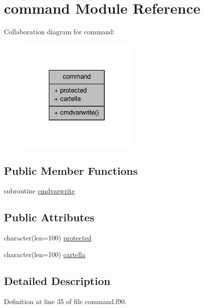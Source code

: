 \hypertarget{classcommand}{\section{command Module Reference}
\label{classcommand}
}


Collaboration diagram for command\-:\nopagebreak
\begin{figure}[H]
\begin{center}
\leavevmode
\includegraphics[width=164pt]{classcommand__coll__graph}
\end{center}
\end{figure}
\subsection*{Public Member Functions}
\begin{DoxyCompactItemize}
\item 
subroutine \hyperlink{classcommand_a60af514b101e4bce27774827c2e01d98}{cmdvarwrite}
\end{DoxyCompactItemize}
\subsection*{Public Attributes}
\begin{DoxyCompactItemize}
\item 
character(len=100) \hyperlink{classcommand_a596972ac961077577aafb0cbfdde83ca}{protected}
\item 
character(len=100) \hyperlink{classcommand_a3f2c4f215ffe8fb65bd1a837b7f3d9a0}{cartella}
\end{DoxyCompactItemize}


\subsection{Detailed Description}


Definition at line 35 of file command.\-f90.



